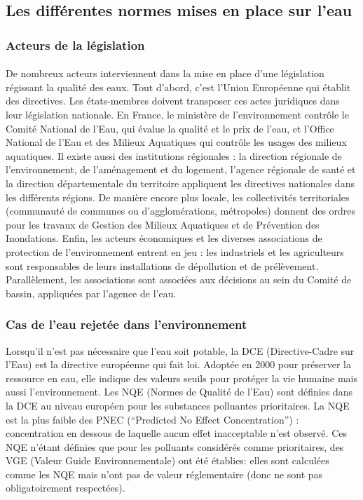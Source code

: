 \documentclass{article}
\begin{document}
\subsection{Les différentes normes mises en place sur l’eau}
\subsubsection{Acteurs de la législation}
\paragraph{} De nombreux acteurs interviennent dans la mise en place d’une législation régissant la qualité des eaux. Tout d’abord, c’est l’Union Européenne qui établit des directives. Les états-membres doivent transposer ces actes juridiques dans leur législation nationale. En France, le  ministère de l’environnement contrôle le Comité National de l’Eau, qui évalue la qualité et le prix de l’eau, et l’Office National de l’Eau et des Milieux Aquatiques  qui contrôle les usages des milieux aquatiques. Il existe aussi des institutions régionales : la direction régionale de l’environnement, de l’aménagement et du logement, l’agence régionale de santé et la direction départementale du territoire  appliquent les directives nationales dans les différents régions. De manière encore plus locale, les collectivités territoriales (communauté de communes ou d’agglomérations, métropoles) donnent des ordres pour les travaux de Gestion des Milieux Aquatiques et de Prévention des Inondations. Enfin, les acteurs économiques et les diverses associations de protection de l’environnement entrent en jeu : les industriels et les agriculteurs sont responsables de leurs installations de dépollution et de prélèvement. Parallèlement, les associations sont associées aux décisions au sein du Comité de bassin, appliquées par l’agence de l’eau.

\subsubsection{Cas de l’eau rejetée dans l’environnement}
Lorsqu’il n’est pas nécessaire que l’eau soit potable, la DCE (Directive-Cadre sur l’Eau) est la directive européenne qui fait loi. Adoptée en 2000 pour préserver la ressource en eau, elle indique des valeurs seuils pour protéger la vie humaine mais aussi l’environnement. Les NQE (Normes de Qualité de l’Eau) sont définies dans la DCE au niveau européen pour les substances polluantes prioritaires. La NQE est la plus faible des PNEC (“Predicted No Effect Concentration”) : concentration en dessous de laquelle aucun effet inacceptable n’est observé. Ces NQE n’étant définies que pour les polluants considérés comme prioritaires, des VGE (Valeur Guide Environnementale) ont été établies: elles sont calculées comme les NQE mais n’ont pas de valeur réglementaire (donc ne sont pas obligatoirement respectées).
\end{document}

